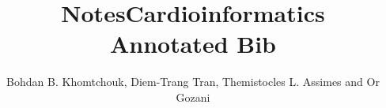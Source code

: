 \documentclass[11pt,legalpaper]{article}
\title{Notes}
\begin{document}
\title{Cardioinformatics\\
Annotated Bib}
\author{Bohdan B. Khomtchouk, Diem-Trang Tran, Themistocles L. Assimes and Or Gozani}

\maketitle
\nocite{*}


\end{document}
